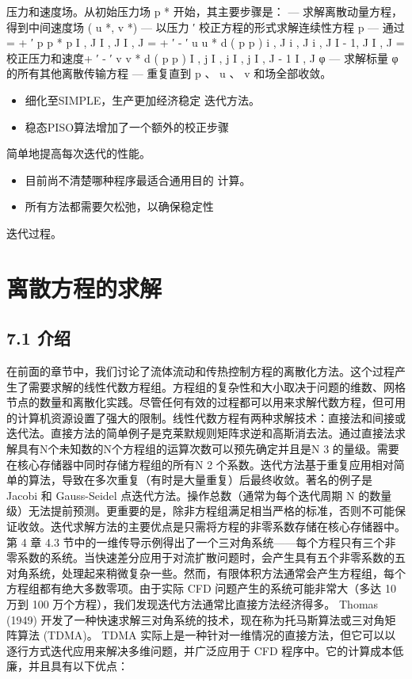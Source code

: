 \documentclass[11pt,a4paper,openany,fontset=none]{ctexbook}
\begin{document}
压力和速度场。从初始压力场 p * 开始，其主要步骤是： — 求解离散动量方程，得到中间速度场 ( u *, v *) — 以压力 ′ 校正方程的形式求解连续性方程 p — 通过 = + ′ p p * p I , J I , J I , J = + ′ - ′ u u * d ( p p ) i , J i , J i , J I - 1, J I , J = 校正压力和速度+ ′ - ′ v v * d ( p p ) I , j I , j I , j I , J - 1 I , J φ — 求解标量 φ 的所有其他离散传输方程 — 重复直到 p 、 u 、 v 和场全部收敛。

\begin{itemize}

\item 细化至SIMPLE，生产更加经济稳定 迭代方法。

\item 稳态PISO算法增加了一个额外的校正步骤

\end{itemize}

简单地提高每次迭代的性能。

\begin{itemize}

\item 目前尚不清楚哪种程序最适合通用目的 计算。

\item 所有方法都需要欠松弛，以确保稳定性

\end{itemize}

迭代过程。

\chapter{离散方程的求解}

\section*{7.1 介绍}

在前面的章节中，我们讨论了流体流动和传热控制方程的离散化方法。这个过程产生了需要求解的线性代数方程组。方程组的复杂性和大小取决于问题的维数、网格节点的数量和离散化实践。尽管任何有效的过程都可以用来求解代数方程，但可用的计算机资源设置了强大的限制。线性代数方程有两种求解技术：直接法和间接或迭代法。直接方法的简单例子是克莱默规则矩阵求逆和高斯消去法。通过直接法求解具有N个未知数的N个方程组的运算次数可以预先确定并且是N 3 的量级。需要在核心存储器中同时存储方程组的所有N 2 个系数。迭代方法基于重复应用相对简单的算法，导致在多次重复（有时是大量重复）后最终收敛。著名的例子是 Jacobi 和 Gauss-Seidel 点迭代方法。操作总数（通常为每个迭代周期 N 的数量级）无法提前预测。更重要的是，除非方程组满足相当严格的标准，否则不可能保证收敛。迭代求解方法的主要优点是只需将方程的非零系数存储在核心存储器中。第 4 章 4.3 节中的一维传导示例得出了一个三对角系统——每个方程只有三个非零系数的系统。当快速差分应用于对流扩散问题时，会产生具有五个非零系数的五对角系统，处理起来稍微复杂一些。然而，有限体积方法通常会产生方程组，每个方程组都有绝大多数零项。由于实际 CFD 问题产生的系统可能非常大（多达 10 万到 100 万个方程），我们发现迭代方法通常比直接方法经济得多。 Thomas (1949) 开发了一种快速求解三对角系统的技术，现在称为托马斯算法或三对角矩阵算法 (TDMA)。 TDMA 实际上是一种针对一维情况的直接方法，但它可以以逐行方式迭代应用来解决多维问题，并广泛应用于 CFD 程序中。它的计算成本低廉，并且具有以下优点：
\end{document}
